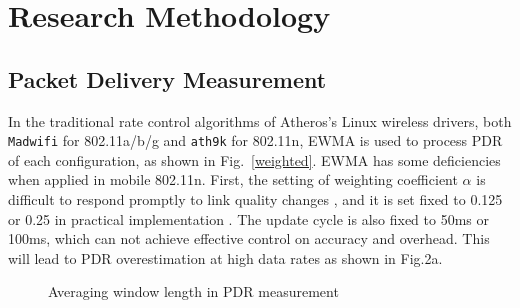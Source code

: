 \documentclass[journal,onecolumn,12pt]{IEEEtran}
\begin{document}
\section{Research Methodology}

\subsection{Packet Delivery Measurement} \label{sect:methodology}

In the traditional rate control algorithms of Atheros's Linux wireless drivers, both \texttt{Madwifi} for 802.11a/b/g and \texttt{ath9k} \cite{ath9k} for 802.11n, EWMA is used to process PDR of each configuration, as shown in Fig.~\ref{weighted}. EWMA has some deficiencies when applied in mobile 802.11n. First, the setting of weighting coefficient $\alpha$ is difficult to respond promptly to link quality changes \cite{EWMAChart}, and it is set fixed to 0.125 or 0.25 in practical implementation \cite{ath9k} \cite{minstrel}. The update cycle is also fixed to 50ms or 100ms, which can not achieve effective control on accuracy and overhead. This will lead to PDR overestimation at high data rates as shown in Fig.2a.

\begin{figure}[!t]
\centerline{
}
\caption{Averaging window length in PDR measurement}
\label{method}
\end{figure}
\end{document}
